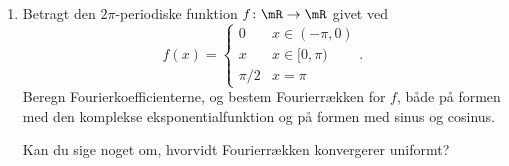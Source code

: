 \begin{opg}[Fourierrækker I]
\begin{enumerate}
	\iffalse\begin{proof}[Løsning]
	Da rækken er uniformt konvergent, så følger det, at
	\begin{align*}
	    c_k = \frac{1}{2\pi}\int_{-\pi}^\pi \sum_{n=-\infty}^\infty \pare{2^{-\abs{n}}e^{inx}}e^{-ikx} \, dx
	    &\overset{\pare{\dagger}}{=} \sum_{n=-\infty}^\infty\frac{1}{2\pi}\int_{-\pi}^\pi 2^{-\abs{n}}e^{inx}e^{-ikx} \, dx \\
	    &= \sum_{n=-\infty}^\infty2^{-\abs{n}}\frac{1}{2\pi}\int_{-\pi}^\pi e^{-i\pare{k-n}x} \, dx \\
	    &= \sum_{n=-\infty}^\infty2^{-\abs{n}}\delta_{n,k} \\
	    &= 2^{-\abs{k}},
	\end{align*}
	hvor $\pare{\dagger}$ følger af MC 3.16 og linearitet af integralet. I tråd med MC 5.22 får vi således
	$$ \sum_{n=-\infty}^\infty 2^{-\abs{n}}e^{inx}. $$
	Vi kan tænke på MC 5.22 som resultatet for Fourierrækker svarende til MC 4.15 for Taylorrækker.
	\end{proof}\fi
	
	\item Betragt den $2\pi$-periodiske funktion $f\colon\mR\to\mR $ givet ved
	$$ f(x) = \begin{cases}
	    0 & x\in(-\pi,0) \\
	    x & x\in[0,\pi)\\
	    \pi/2 & x = \pi
	\end{cases}. $$
	Beregn Fourierkoefficienterne, og bestem Fourierrækken for $f$,
	både på formen med den komplekse eksponentialfunktion og på formen med sinus og cosinus.
	
    Kan du sige noget om, hvorvidt Fourierrækken konvergerer uniformt? 
	
	\iffalse\begin{proof}[Løsning]
	Vi får for $k\in\mZ\setminus\{0\}$, at
	\begin{align*}
	    c_k = \frac{1}{2\pi}\int_{-\pi}^\pi f\pare{x}e^{-ikx} \, dx
	        &= \frac{1}{2\pi}\int_0^\pi xe^{-ikx} \, dx \\
	        &= \frac{1}{2\pi}\pare{\brac{x \frac{1}{-ik}e^{-ikx}}_{x=0}^\pi + \frac{1}{ik}\int_0^\pi e^{-ikx} \, dx} \\
	        &= \frac{1}{2\pi}\pare{\frac{\pare{-1}^k}{k}i\pi + \frac{\pare{-1}^k-1}{k^2}} \\
	        &= \frac{-1 + \pare{-1}^k\pare{1+i\pi k}}{2\pi k^2},
	\end{align*}
	mens $c_0 = \frac{1}{2\pi}\int_{-\pi}^\pi f\pare{x}\, dx = \frac{\pi}{4}$
	hvorfor Fourierrækken er givet ved
	$$ \frac{\pi}{4} + \sum_{k=1}^\infty
	    \pare{\frac{-1 + \pare{-1}^k\pare{1+i\pi k}}{2\pi k^2} e^{ikx}
	    + \frac{-1 + \pare{-1}^k\pare{1-i\pi k}}{2\pi k^2} e^{-ikx}}$$
	eller cosinus-sinus form
	$$ \frac{\pi}{4} + \sum_{k=1}^\infty \pare{\frac{\pare{-1}^k-1}{\pi k^2}\cos\pare{kx} + \frac{\pare{-1}^k}{k+1}\sin\pare{kx}}. $$
	Bemærk at Fourierrækken ikke kan være uniformt konvergent på hele $\mR$ med $f$ som grænsefunktion, da $f$ er diskontinuert. 
	\end{proof}\fi
	

\end{enumerate}
\end{opg}
